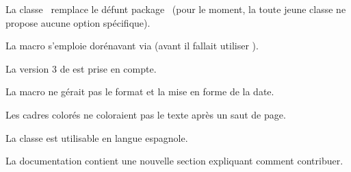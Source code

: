 \documentclass[12pt, a4paper]{article}
\begin{document}
\begin{tdocbreak}
	\item La classe \thisproj\ remplace le défunt package \thisproj\ (pour le moment, la toute jeune classe ne propose aucune option spécifique).

	\item La macro  s'emploie dorénavant via  (avant il fallait utiliser ).
\end{tdocbreak}


\begin{tdocfix}
	\item La version 3 de  est prise en compte.

	\item La macro  ne gérait pas le format et la mise en forme de la date.

	\item Les cadres colorés ne coloraient pas le texte après un saut de page.
\end{tdocfix}


\begin{tdocnew}
	\item La classe est utilisable en langue espagnole.

	\item La documentation contient une nouvelle section expliquant comment contribuer.
\end{tdocnew}
\end{document}
